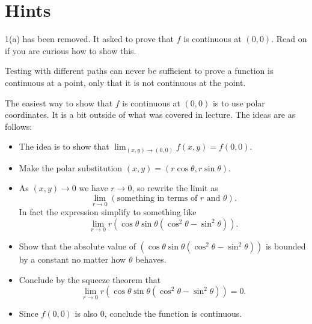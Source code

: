 \section{Hints}
\begin{hint}
  1(a) has been removed. It asked to prove that $f$ is continuous at $(0,0)$. Read on if you are curious how to show this.

  Testing with different paths can never be sufficient to prove a function is continuous at a point, only that it is not continuous at the point.

  The easiest way to show that $f$ is continuous at $(0,0)$ is to use polar coordinates. It is a bit outside of what was covered in lecture. The ideas are as follows:
  \begin{itemize}
    \item The idea is to show that $\lim_{(x,y)\to (0,0)}f(x,y)=f(0,0)$.
    \item Make the polar substitution $(x,y)=(r\cos\theta,r\sin\theta)$.
    \item As $(x,y)\to 0$ we have $r\to 0$, so rewrite the limit as
    \[\lim_{r\to 0}(\text{something in terms of $r$ and $\theta$}).\]
    In fact the expression simplify to something like
    \[\lim_{r\to 0}r(\cos\theta\sin\theta(\cos^2\theta-\sin^2\theta)).\]
    \item Show that the absolute value of $(\cos\theta\sin\theta(\cos^2\theta-\sin^2\theta))$ is bounded by a constant no matter how $\theta$ behaves.
    \item Conclude by the squeeze theorem that
    \[\lim_{r\to 0}r(\cos\theta\sin\theta(\cos^2\theta-\sin^2\theta))=0.\]
    \item Since $f(0,0)$ is also 0, conclude the function is continuous.
  \end{itemize}
\end{hint}
